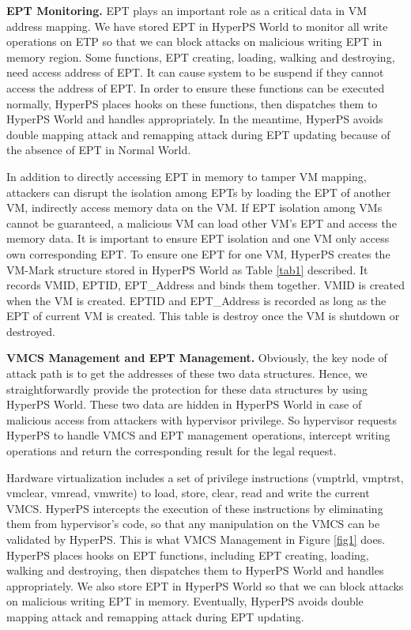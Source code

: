 \documentclass[conference]{IEEEtran}
\begin{document}
\textbf{EPT Monitoring.}
EPT plays an important role as a critical data in VM address mapping. We have stored EPT in HyperPS World to monitor all write operations on ETP so that we can block attacks on malicious writing EPT in memory region.
Some functions, EPT creating, loading, walking and destroying, need access address of EPT. It can cause system to be suspend if they cannot access the address of EPT. In order to ensure these functions can be executed normally, HyperPS places hooks on these functions, then dispatches them to HyperPS World and handles appropriately.
In the meantime, HyperPS avoids double mapping attack and remapping attack during EPT updating because of the absence of EPT in Normal World.

In addition to directly accessing EPT in memory to tamper VM mapping, attackers can disrupt the isolation among EPTs by loading the EPT of another VM, indirectly access memory data on the VM.
If EPT isolation among VMs cannot be guaranteed, a malicious VM can load other VM's EPT and access the memory data. It is important to ensure EPT isolation and one VM only access own corresponding EPT.
To ensure one EPT for one VM, HyperPS creates the VM-Mark structure stored in HyperPS World as Table \ref{tab1} described. It records VMID, EPTID, EPT\_Address and binds them together. VMID is created when the VM is created. 
 EPTID and EPT\_Address is recorded as long as the EPT of current VM is created. This table is destroy once the  VM is shutdown or destroyed.

\fi

\textbf{VMCS Management and EPT Management.}
Obviously, the key node of attack path is to get the addresses of these two data structures.
Hence, we straightforwardly provide the protection for these data structures by using HyperPS World. These two data are hidden in HyperPS World in case of malicious access from attackers with hypervisor privilege. 
So hypervisor requests HyperPS to handle VMCS and EPT management operations, intercept writing operations and return the corresponding result for the legal request. 

Hardware virtualization includes a set of privilege instructions (vmptrld, vmptrst, vmclear, vmread, vmwrite) to load, store, clear, read and write the current VMCS. HyperPS intercepts the execution of these instructions by eliminating them from hypervisor's code, so that any manipulation on the VMCS can be validated by HyperPS. This is what VMCS Management in Figure \ref{fig1} does.
HyperPS places hooks on  EPT functions, including EPT creating, loading, walking and destroying, then dispatches them to HyperPS World and handles appropriately.
We also store EPT in HyperPS World so that we can block attacks on malicious writing EPT in memory. Eventually, HyperPS avoids double mapping attack and remapping attack during EPT updating.
\end{document}
